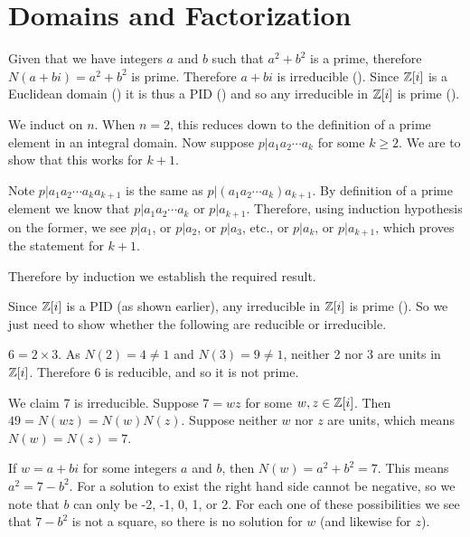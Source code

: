 \section{Domains and Factorization}
\begin{questions}
    \item Given that we have integers $a$ and $b$ such that $a^2 + b^2$ is a prime, therefore $N(a+bi) = a^2+b^2$ is prime. Therefore $a+bi$ is irreducible (). Since $\mathbb{Z}[i]$ is a Euclidean domain () it is thus a PID () and so any irreducible in $\mathbb{Z}[i]$ is prime ().

    \item We induct on $n$. When $n = 2$, this reduces down to the definition of a prime element in an integral domain. Now suppose $p \vert a_1a_2\cdots a_k$ for some $k \geq 2$. We are to show that this works for $k + 1$.

    Note $p \vert a_1a_2\cdots a_ka_{k+1}$ is the same as $p \vert (a_1a_2\cdots a_k)a_{k+1}$. By definition of a prime element we know that $p \vert a_1a_2\cdots a_k$ or $p \vert a_{k+1}$. Therefore, using induction hypothesis on the former, we see $p\vert a_1$, or $p\vert a_2$, or $p \vert a_3$, etc., or $p \vert a_k$, or $p \vert a_{k+1}$, which proves the statement for $k + 1$.

    Therefore by induction we establish the required result.

    \item Since $\mathbb{Z}[i]$ is a PID (as shown earlier), any irreducible in $\mathbb{Z}[i]$ is prime (). So we just need to show whether the following are reducible or irreducible.
    \begin{partquestions}{\alph*}
        \item $6 = 2 \times 3$. As $N(2) = 4 \neq 1$ and $N(3) = 9 \neq 1$, neither 2 nor 3 are units in $\mathbb{Z}[i]$. Therefore 6 is reducible, and so it is not prime.

        \item We claim 7 is irreducible. Suppose $7 = wz$ for some $w,z \in \mathbb{Z}[i]$. Then $49 = N(wz) = N(w)N(z)$. Suppose neither $w$ nor $z$ are units, which means $N(w) = N(z) = 7$.

        If $w = a+bi$ for some integers $a$ and $b$, then $N(w) = a^2+b^2 = 7$. This means $a^2 = 7 - b^2$. For a solution to exist the right hand side cannot be negative, so we note that $b$ can only be -2, -1, 0, 1, or 2. For each one of these possibilities we see that $7 - b^2$ is not a square, so there is no solution for $w$ (and likewise for $z$).


\end{partquestions}
\end{questions}

